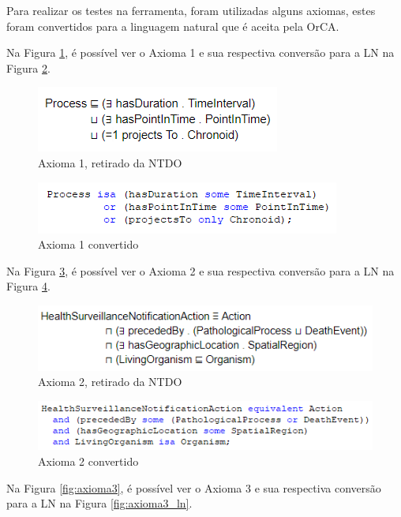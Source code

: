 \documentclass{bcc}
\begin{document}
Para realizar os testes na ferramenta, foram utilizadas alguns axiomas, estes foram convertidos para a linguagem natural que é aceita pela OrCA.

Na Figura \ref{fig:axioma1}, é possível ver o Axioma 1 e sua respectiva conversão para a LN na Figura \ref{fig:axioma1_ln}.

\begin{figure}[H]
\centering
\includegraphics[width=.5\textwidth]{Figuras/axioma1.png}
\caption{Axioma 1, retirado da NTDO} 
\label{fig:axioma1}
\end{figure}

\begin{figure}[H]
\centering
\includegraphics[width=.8\textwidth]{Figuras/axioma1_ln.png}
\caption{Axioma 1 convertido} 
\label{fig:axioma1_ln}
\end{figure}

Na Figura \ref{fig:axioma2}, é possível ver o Axioma 2 e sua respectiva conversão para a LN na Figura \ref{fig:axioma2_ln}.

\begin{figure}[H]
\centering
\includegraphics[width=.8\textwidth]{Figuras/axioma2.png}
\caption{Axioma 2, retirado da NTDO} 
\label{fig:axioma2}
\end{figure}

\begin{figure}[H]
\centering
\includegraphics[width=.9\textwidth]{Figuras/axioma2_ln.png}
\caption{Axioma 2 convertido} 
\label{fig:axioma2_ln}
\end{figure}

Na Figura \ref{fig:axioma3}, é possível ver o Axioma 3 e sua respectiva conversão para a LN na Figura \ref{fig:axioma3_ln}.
\end{document}
